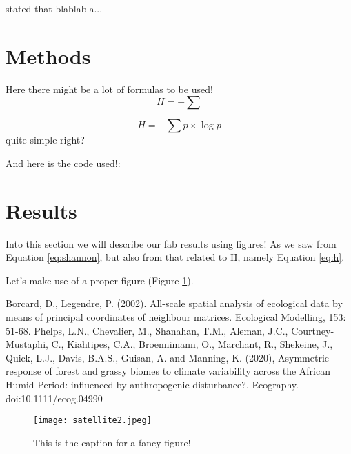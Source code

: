 \documentclass[a4paper,12pt]{article}
\begin{document}
\citet{phelps} stated that blablabla...

\section{Methods}
Here there might be a lot of formulas to be used!
\begin{equation}
    H = - \sum
\label{eq:h}
\end{equation}

\begin{equation}
    H = - \sum p \times \log{p}
\label{eq:shannon}
\end{equation}
quite simple right?

And here is the code used!:


\section{Results}
Into this section we will describe our fab results using figures! As we saw from Equation \ref{eq:shannon}, but also from that related to H, namely Equation  \ref{eq:h}.

Let's make use of a proper figure (Figure \ref{fig:sat}).

\begin{thebibliography}{999}
Borcard, D., Legendre, P. (2002). All-scale spatial analysis of ecological data by means of principal coordinates of neighbour matrices. Ecological Modelling, 153: 51-68.
% 
Phelps, L.N., Chevalier, M., Shanahan, T.M., Aleman, J.C., Courtney‐Mustaphi, C., Kiahtipes, C.A., Broennimann, O., Marchant, R., Shekeine, J., Quick, L.J., Davis, B.A.S., Guisan, A. and Manning, K. (2020), Asymmetric response of forest and grassy biomes to climate variability across the African Humid Period: influenced by anthropogenic disturbance?. Ecography. doi:10.1111/ecog.04990
% 
\end{thebibliography}

\newpage

\begin{figure}
    \centering
    \texttt{[image: satellite2.jpeg]}
    \caption{This is the caption for a fancy figure!}
    \label{fig:sat}
\end{figure}
\end{document}
